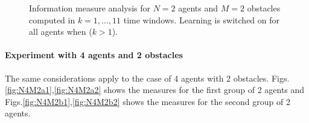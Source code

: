\begin{figure}[htbp]
  \begin{center}
    \caption[Max correlation for two learning agents]{Information measure analysis for $N=2$ agents
	      and $M=2$ obstacles computed in $k=1,...,11$ time windows.
	      Learning is switched on for all agents when ($k>1$).\label{fig:N2M2b}}
  \end{center}
\end{figure}

\paragraph{Experiment with 4 agents and 2 obstacles}
The same considerations apply to the case of 4 agents with 2 obstacles.
Figs.\ref{fig:N4M2a1},\ref{fig:N4M2a2} shows the measures for the first group of 2 agents and Figs.\ref{fig:N4M2b1},\ref{fig:N4M2b2}
shows the measures for the second group of 2 agents.

